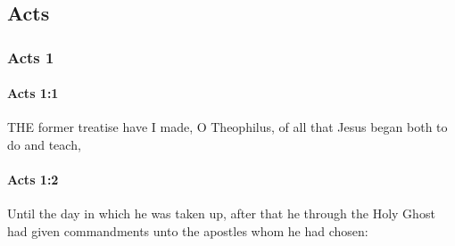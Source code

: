 \subsection{Acts}
	\label{ACTS}
	
	\subsubsection{Acts 1} %
		\label{ACTS-1}
		
		\paragraph{Acts 1:1} %
			\label{ACTS-1-1}

			THE former treatise have I made, O Theophilus, of all that Jesus began both to do and teach,

			\begin{framed}
			\scriptsize
				\begin{compactdesc}
					\item[SBLG] 
				\end{compactdesc}
			\end{framed}

		\paragraph{Acts 1:2} %
			\label{ACTS-1-2}

			Until the day in which he was taken up, after that he through the Holy Ghost had given commandments unto the apostles whom he had chosen:

